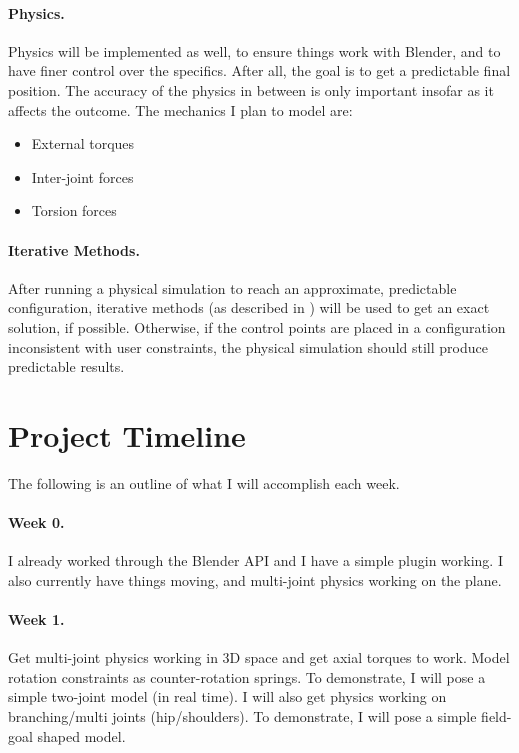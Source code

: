 \documentclass[10pt,twocolumn,letterpaper]{article}
\begin{document}
\paragraph{Physics.} Physics will be implemented as well, to ensure things work with Blender, and to have finer control over the specifics. After all, the goal is to get a predictable final position. The accuracy of the physics in between is only important insofar as it affects the outcome. The mechanics I plan to model are:
\begin{itemize}
    \item External torques
    \item Inter-joint forces
    \item Torsion forces
\end{itemize}

\paragraph{Iterative Methods.} After running a physical simulation to reach an approximate, predictable configuration, iterative methods (as described in \cite{Sm}\cite{Ku}\cite{Ar}) will be used to get an exact solution, if possible. Otherwise, if the control points are placed in a configuration inconsistent with user constraints, the physical simulation should still produce predictable results.

\section*{Project Timeline}

The following is an outline of what I will accomplish each week.

\paragraph{Week 0.} I already worked through the Blender API and I have a simple plugin working. I also currently have things moving, and multi-joint physics working on the plane.

\paragraph{Week 1.} Get multi-joint physics working in 3D space and get axial torques to work. Model rotation constraints as counter-rotation springs. To demonstrate, I will pose a simple two-joint model (in real time). I will also get physics working on branching/multi joints (hip/shoulders). To demonstrate, I will pose a simple field-goal shaped model.
\end{document}
